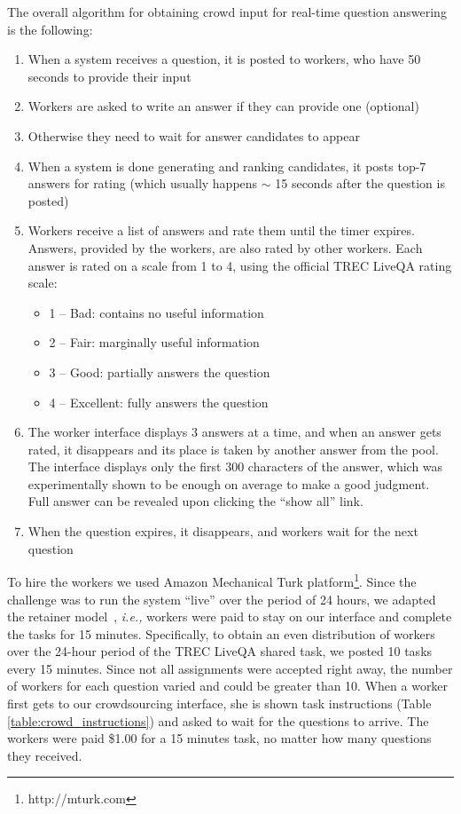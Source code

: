\documentclass[letterpaper]{article}
\makeatletter
\newcommand{\ie}{\textit{i.e.,}\@\xspace}
\makeatother
\begin{document}
The overall algorithm for obtaining crowd input for real-time question answering is the following:
\begin{enumerate}
\item When a system receives a question, it is posted to workers, who have 50 seconds to provide their input
\item Workers are asked to write an answer if they can provide one (optional)
\item Otherwise they need to wait for answer candidates to appear
\item When a system is done generating and ranking candidates, it posts top-7 answers for rating (which usually happens $\sim$ 15 seconds after the question is posted)
\item Workers receive a list of answers and rate them until the timer expires. Answers, provided by the workers, are also rated by other workers. Each answer is rated on a scale from 1 to 4, using the official TREC LiveQA rating scale:
	\begin{itemize}[noitemsep,topsep=0pt]
    \item 1 -- Bad: contains no useful information
    \item 2 -- Fair: marginally useful information
    \item 3 -- Good: partially answers the question
    \item 4 -- Excellent: fully answers the question
    \end{itemize}
\item The worker interface displays 3 answers at a time, and when an answer gets rated, it disappears and its place is taken by another answer from the pool. The interface displays only the first 300 characters of the answer, which was experimentally shown to be enough on average to make a good judgment.
Full answer can be revealed upon clicking the ``show all'' link.
\item When the question expires, it disappears, and workers wait for the next question
\end{enumerate}

To hire the workers we used Amazon Mechanical Turk platform\footnote{http://mturk.com}.
Since the challenge was to run the system ``live'' over the period of 24 hours, we adapted the retainer model~\cite{bernstein2011crowds,bigham2010vizwiz}, \ie workers were paid to stay on our interface and complete the tasks for 15 minutes.
Specifically, to obtain an even distribution of workers over the 24-hour period of the TREC LiveQA shared task, we posted 10 tasks every 15 minutes.
Since not all assignments were accepted right away, the number of workers for each question varied and could be greater than 10.
When a worker first gets to our crowdsourcing interface, she is shown task instructions (Table \ref{table:crowd_instructions}) and asked to wait for the questions to arrive.
The workers were paid \$1.00 for a 15 minutes task, no matter how many questions they received.
\end{document}
